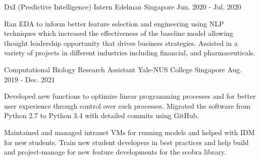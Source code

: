 \begin{cventries}
  \cventry
    {DxI (Predictive Intelligence) Intern} %
    {Edelman} %
    {Singapore} %
    {Jun. 2020 - Jul. 2020} %
    {
      \begin{cvitems} %
        \item {Ran EDA to inform better feature selection and engineering using NLP techniques which increased the effectiveness of the baseline model allowing thought leadership opportunity that drives business strategies.  Assisted in a variety of projects in different industries including financial, and pharmaceuticals.}
      \end{cvitems}
    }
    
  \cventry
    {Computational Biology Research Assistant} %
    {Yale-NUS College} %
    {Singapore} %
    {Aug. 2019 - Dec. 2021} %
    {
      \begin{cvitems} %
        \item {Developed new functions to optimize linear programming processes and for better user experience through control over such processes. Migrated the software from Python 2.7 to Python 3.4 with detailed commits using GitHub.}
        \item {Maintained and managed intranet VMs for running models and helped with IDM for new students.  Train new student developers in best practices and help build and project-manage for new feature developments for the scobra library.}
      \end{cvitems}
    }
\end{cventries}
